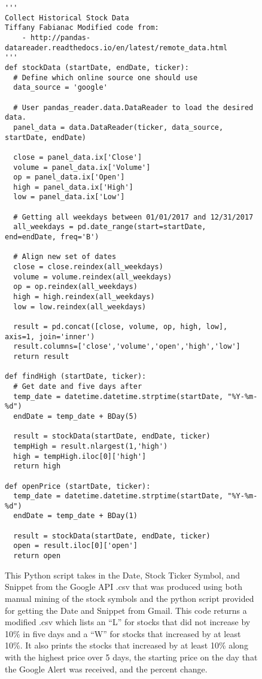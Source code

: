 \documentclass[sigconf]{acmart}
\begin{document}
\begin{figure*}[htb]
\begin{verbatim}
'''
Collect Historical Stock Data
Tiffany Fabianac Modified code from:
    - http://pandas-datareader.readthedocs.io/en/latest/remote_data.html
'''
def stockData (startDate, endDate, ticker):
  # Define which online source one should use
  data_source = 'google'

  # User pandas_reader.data.DataReader to load the desired data.
  panel_data = data.DataReader(ticker, data_source, startDate, endDate)

  close = panel_data.ix['Close']
  volume = panel_data.ix['Volume']
  op = panel_data.ix['Open']
  high = panel_data.ix['High']
  low = panel_data.ix['Low']

  # Getting all weekdays between 01/01/2017 and 12/31/2017
  all_weekdays = pd.date_range(start=startDate, end=endDate, freq='B')

  # Align new set of dates
  close = close.reindex(all_weekdays)
  volume = volume.reindex(all_weekdays)
  op = op.reindex(all_weekdays)
  high = high.reindex(all_weekdays)
  low = low.reindex(all_weekdays)

  result = pd.concat([close, volume, op, high, low], axis=1, join='inner')
  result.columns=['close','volume','open','high','low']
  return result
  
def findHigh (startDate, ticker):
  # Get date and five days after
  temp_date = datetime.datetime.strptime(startDate, "%Y-%m-%d")
  endDate = temp_date + BDay(5)

  result = stockData(startDate, endDate, ticker)
  tempHigh = result.nlargest(1,'high')
  high = tempHigh.iloc[0]['high']
  return high

def openPrice (startDate, ticker):
  temp_date = datetime.datetime.strptime(startDate, "%Y-%m-%d")
  endDate = temp_date + BDay(1)

  result = stockData(startDate, endDate, ticker)
  open = result.iloc[0]['open']
  return open
\end{verbatim}
\caption{This Python script takes in the Date, Stock Ticker Symbol, and Snippet from the Google API .csv that was produced using both manual mining of the stock symbols and the python script provided for getting the Date and Snippet from Gmail. This code returns a modified .csv which lists an ``L'' for stocks that did not increase by 10\% in five days and a ``W'' for stocks that increased by at least 10\%. It also prints the stocks that increased by at least 10\% along with the highest price over 5 days, the starting price on the day that the Google Alert was received, and the percent change.}\label{c:stock}
\end{figure*}
\end{document}
